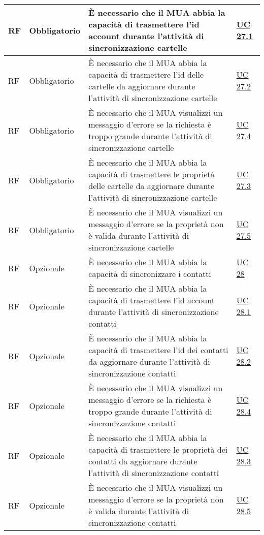 \begin{longtable}{*{1}{>{\centering\arraybackslash}p{1.5cm}}*{1}{>{\centering\arraybackslash}p{2.5cm}}p{6cm}*{1}{>{\centering\arraybackslash}p{3cm}}}
    RF & Obbligatorio & È necessario che il MUA abbia la capacità di trasmettere l'id account durante l'attività di sincronizzazione cartelle & \hyperref[sec:UC27.1]{UC 27.1}
    \\\hline
    RF & Obbligatorio & È necessario che il MUA abbia la capacità di trasmettere l'id delle cartelle da aggiornare durante l'attività di sincronizzazione cartelle & \hyperref[sec:UC27.2]{UC 27.2}
    \\\hline
    RF & Obbligatorio & È necessario che il MUA visualizzi un messaggio d'errore se la richiesta è troppo grande durante l'attività di sincronizzazione cartelle & \hyperref[sec:UC27.4]{UC 27.4}
    \\\hline
    RF & Obbligatorio & È necessario che il MUA abbia la capacità di trasmettere le proprietà delle cartelle da aggiornare durante l'attività di sincronizzazione cartelle & \hyperref[sec:UC27.3]{UC 27.3}
    \\\hline
    RF & Obbligatorio & È necessario che il MUA visualizzi un messaggio d'errore se la proprietà non è valida durante l'attività di sincronizzazione cartelle & \hyperref[sec:UC27.5]{UC 27.5}
    \\\hline
    RF & Opzionale & È necessario che il MUA abbia la capacità di sincronizzare i contatti & \hyperref[sec:UC28]{UC 28}
    \\\hline
    RF & Opzionale & È necessario che il MUA abbia la capacità di trasmettere l'id account durante l'attività di sincronizzazione contatti & \hyperref[sec:UC28.1]{UC 28.1}
    \\\hline
    RF & Opzionale & È necessario che il MUA abbia la capacità di trasmettere l'id dei contatti da aggiornare durante l'attività di sincronizzazione contatti & \hyperref[sec:UC28.2]{UC 28.2}
    \\\hline
    RF & Opzionale & È necessario che il MUA visualizzi un messaggio d'errore se la richiesta è troppo grande durante l'attività di sincronizzazione contatti & \hyperref[sec:UC28.4]{UC 28.4}
    \\\hline
    RF & Opzionale & È necessario che il MUA abbia la capacità di trasmettere le proprietà dei contatti da aggiornare durante l'attività di sincronizzazione contatti & \hyperref[sec:UC28.3]{UC 28.3}
    \\\hline
    RF & Opzionale & È necessario che il MUA visualizzi un messaggio d'errore se la proprietà non è valida durante l'attività di sincronizzazione contatti & \hyperref[sec:UC28.5]{UC 28.5}
    \\\hline

\end{longtable}

